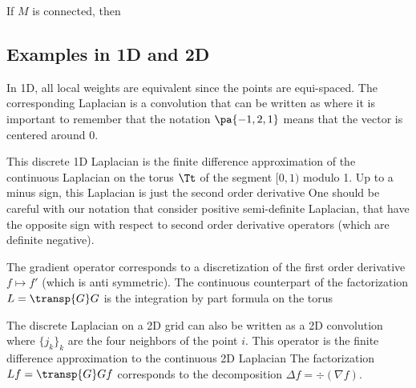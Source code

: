 \begin{thm} If $M$ is connected, then 
\end{thm}


\subsection{Examples in 1D and 2D}

In 1D, all local weights are equivalent since the points are equi-spaced. The corresponding Laplacian is a convolution that can be written as
where it is important to remember that the notation $\pa{ -1,2,1 }$ means that the vector is centered around $0$.

This discrete 1D Laplacian is the finite difference approximation of the continuous Laplacian on the torus $\Tt$ of the segment $[0,1)$ modulo 1. Up to a minus sign, this Laplacian is just the second order derivative
One should be careful with our notation that consider positive semi-definite Laplacian, that have the opposite sign with respect to second order derivative operators (which are definite negative).

The gradient operator corresponds to a discretization of the first order derivative $f \mapsto f'$ (which is anti symmetric). The continuous counterpart of the factorization $L=\transp{G} G$ is the integration by part formula on the torus

The discrete Laplacian on a 2D grid can also be written as a 2D convolution
where $\{j_k\}_k$ are the four neighbors of the point $i$. This operator is the finite difference approximation to the continuous 2D Laplacian
The factorization $L f = \transp{G}G f$ corresponds to the decomposition $\Delta f = \div(\nabla f)$.


